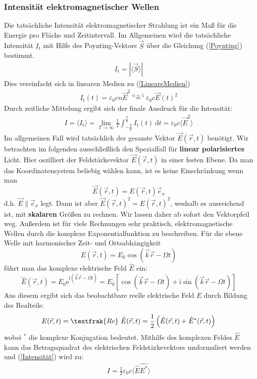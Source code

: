 \documentclass[german,  %
parskip=full,  %
]{scrartcl}
\begin{document}
\subsubsection{Intensität elektromagnetischer Wellen}
Die tatsächliche Intensität elektromagnetischer Strahlung ist ein Maß für die Energie pro Fläche und Zeitintervall. Im Allgemeinen wird die tatsächliche Intensität $I_{\mathrm{t}}$ mit Hilfe des Poynting-Vektors $\vec{S}$ über die Gleichung (\ref{Poynting}) bestimmt.
\begin{align}
\label{Poynting} I_{\mathrm{t}}=| \langle \vec{S} \rangle |
\end{align}
Dies vereinfacht sich in linearen Medien zu (\ref{LineareMedien})
\begin{align}
\label{LineareMedien} I_{\mathrm{t}}(t)= \varepsilon_0 c n \vec{E}^2 \stackrel{n=1}{=} \varepsilon_0 c \vec{E}(t)^2
\end{align}
Durch zeitliche Mittelung ergibt sich der finale Ausdruck für die Intensität:
\begin{align}
\label{Intensität} I = \langle I_{\mathrm{t}} \rangle = \lim\limits_{T \rightarrow \infty} \frac{1}{T} \int_{- \frac{T}{2}}^{\frac{T}{2}} I_{\mathrm{t}}(t) \ \mathrm{d}t = \varepsilon_0 c  \langle \vec{E}^2 \rangle
\end{align}
Im allgemeinen Fall wird tatsächlich der gesamte Vektor \(\vec{E}(\vec{r},t)\) benötigt. Wir betrachten im folgenden ausschließlich den Spezialfall für \textbf{linear polarisiertes} Licht. Hier oszilliert der Feldstärkevektor \(\vec{E}(\vec{r},t)\) in einer festen Ebene. Da man das Koordinatensystem beliebig wählen kann, ist es keine Einschränkung wenn man 
\[\vec{E}(\vec{r},t) = E(\vec{r},t)\vec{e}_x\]
d.h. \(\vec{E}\parallel\vec{e}_x\) legt. Dann ist aber \(\vec{E}(\vec{r},t)^2 = E(\vec{r},t)^2\), weshalb es ausreichend ist, mit \textbf{skalaren} Größen zu rechnen. Wir lassen daher ab sofort den Vektorpfeil weg. Außerdem ist für viele Rechnungen sehr praktisch, elektromagnetische Wellen durch die komplexe Exponentialfunktion zu beschreiben. Für die ebene Welle mit harmonischer Zeit- und Ortsabhängigkeit
\[E(\vec{r},t) = E_0 \cos (\vec{k}\vec{r} - \Omega t)\]
führt man das komplexe elektrische Feld \(\hat{E}\) ein:
\[\hat{E}(\vec{r},t) = E_0 \mathrm{e}^{\mathrm{i}(\vec{k}\vec{r} - \Omega t)} = E_0 \left[\cos (\vec{k}\vec{r} - \Omega t) + \mathrm{i}\sin (\vec{k}\vec{r} - \Omega t)\right]\]
Aus diesem ergibt sich das beobachtbare reelle elektrische Feld \(E\) durch Bildung des Realteils:
\[E(\vec{r},t) = \textfrak{Re} \ \hat{E}(\vec{r},t) = \frac{1}{2}\left(\hat{E}(\vec{r},t) + \hat{E}^{*}(\vec{r},t)\right)\]
wobei \(^{*}\) die komplexe Konjugation bedeutet. Mithilfe des komplexen Feldes \(\hat{E}\) kann das Betragsquadrat des elektrischen Feldstärkevektors umformuliert werden und (\ref{Intensität}) wird zu:
\begin{align}
\label{Intensität2} I = \frac{1}{2} \varepsilon_0 c \langle \hat{E} \hat{E^*} \rangle
\end{align}
\end{document}
